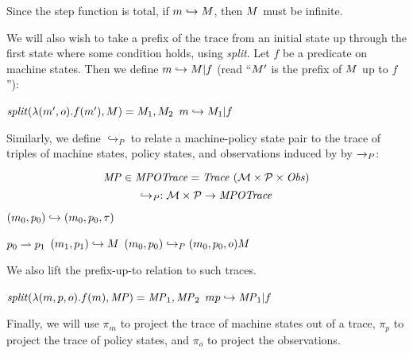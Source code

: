 \documentclass[acmsmall,review,anonymous]{acmart}\settopmatter{printfolios=true,printccs=false,printacmref=false}
\begin{document}
Since the step function is total, if \(\mach \hookrightarrow \machT\),
then \(M\) must be infinite.

We will also wish to take a prefix of the trace from an initial state up through the first state where
some condition holds, using {\it split}. Let \(f\) be a predicate on machine states. Then we define
\(m \hookrightarrow M | f\) (read ``\(M'\) is the prefix of \(M\) up to \(f\)''):
  
  \judgmenttwo{\(\mach \hookrightarrow \machT\)}
              {\(\mathit{split}(\lambda (m',o).f(m'),M) = M_1,M_2\)}
              {\(m \hookrightarrow M_1 | f\)}

Similarly, we define \(\hookrightarrow_P\) to relate a machine-policy
state pair to the trace of triples of machine states, policy states,
and observations induced by by \(\xrightarrow{}_P\):

  \[\mathit{MP} \in \mathit{MPOTrace} = \mathit{Trace}\ ({\mathcal M} \times \mathcal{P} \times \mathit{Obs})\]
  \[\hookrightarrow_P : {\mathcal M} \times \mathcal{P} \rightarrow \mathit{MPOTrace}\]

           {\((m_0,p_0) \hookrightarrow (m_0,p_0,\tau)\)}
  
                {\(p_0 \rightharpoonup p_1\)}
                {\((m_1,p_1) \hookrightarrow M\)}
      {\((m_0,p_0) \hookrightarrow_P (m_0,p_0,o) M\)}

We also lift the prefix-up-to relation to such traces.
  
  \judgmenttwo{\(\mpstatename \hookrightarrow \MPT\)}
              {\(\mathit{split}(\lambda (m,p,o).f(m),\mathit{MP}) = \mathit{MP}_1,\mathit{MP}_2\)}
         {\(mp \hookrightarrow \mathit{MP}_1 | f\)}

Finally, we will use \(\pi_m\) to project the trace of machine states
out of a trace, \(\pi_p\) to project the trace of policy states, and
\(\pi_o\) to project the observations.

\end{document}
